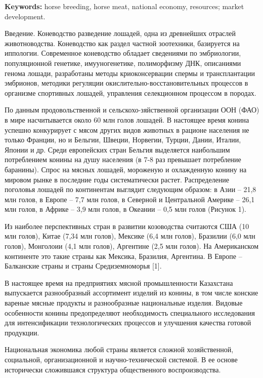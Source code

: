 {\bfseries Keywords:} horse breeding, horse meat, national economy, resources;
market development.
\begin{multicols}{2}

Введение. Коневодство разведение лошадей, одна из древнейших отраслей
животноводства. Коневодство как раздел частной зоотехники, базируется на
иппологии. Современное коневодство обладает сведениями по эмбриологии,
популяционной генетике, имууногенетике, полиморфизму ДНК, описаниями
генома лошади, разработаны методы криоконсервации спермы и
трансплантации эмбрионов, методики регуляции
окислительно-восстановительных процессов в организме спортивных лошадей,
управления селекционном процессом в породах.

По данным продовольственной и сельскохо-зяйственной организации ООН (ФАО)
в мире насчитывается около 60 млн голов лошадей. В настоящее время
конина успешно конкурирует с мясом других видов животных в рационе
населения не только Франции, но и Бельгии, Швеции, Норвегии, Турции,
Дании, Италии, Японии и др. Среди европейских стран Бельгия выделяется
наибольшим потреблением конины на душу населения (в 7-8 раз превышает
потребление баранины). Спрос на мясных лошадей, мороженую и охлажденную
конину на мировом рынке в последние годы систематически растет.
Распределение поголовья лошадей по континентам выглядит следующим
образом: в Азии -- 21,8 млн голов, в Европе -- 7,7 млн голов, в Северной
и Центральной Америке -- 26,1 млн голов, в Африке -- 3,9 млн голов, в
Океании -- 0,5 млн голов (Рисунок 1).


Из наиболее перспективных стран в развитии козоводства считаются США (10
млн голов), Китае (7,34 млн голов), Мексике (6,4 млн голов), Бразилии
(6,0 млн голов), Монголоии (4,1 млн голов), Аргентине (2,5 млн голов).
На Американском континенте это такие страны как Мексика, Бразилия,
Аргентина. В Европе -- Балканские страны и страны Средиземноморья
{[}1{]}.



В настоящее время на предприятиях мясной промышленности Казахстана
выпускается разнообразный ассортимент изделий из конины, в том числе
конские вареные мясные продукты и разнообразные национальные изделия.
Видовые особенности конины предопределяют необходимость специального
исследования для интенсификации технологических процессов и улучшения
качества готовой продукции.


Национальная экономика любой страны является сложной хозяйственной,
социальной, организационной и научно-технической системой. В ее основе
исторически сложившаяся структура общественного воспроизводства.

\end{multicols}

